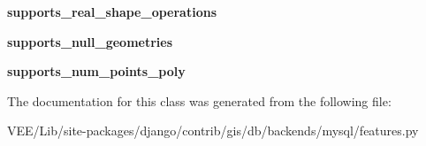 \begin{DoxyCompactItemize}
{\bfseries supports\+\_\+real\+\_\+shape\+\_\+operations}
\item 
\mbox{\label{classdjango_1_1contrib_1_1gis_1_1db_1_1backends_1_1mysql_1_1features_1_1_database_features_ab367cbbdb4c8b39cccb1be240edcab49}} 
{\bfseries supports\+\_\+null\+\_\+geometries}
\item 
\mbox{\label{classdjango_1_1contrib_1_1gis_1_1db_1_1backends_1_1mysql_1_1features_1_1_database_features_a6d9fac06e828cc3c56835fd5e19acc52}} 
{\bfseries supports\+\_\+num\+\_\+points\+\_\+poly}
\end{DoxyCompactItemize}


The documentation for this class was generated from the following file\+:\begin{DoxyCompactItemize}
\item 
V\+E\+E/\+Lib/site-\/packages/django/contrib/gis/db/backends/mysql/features.\+py\end{DoxyCompactItemize}
